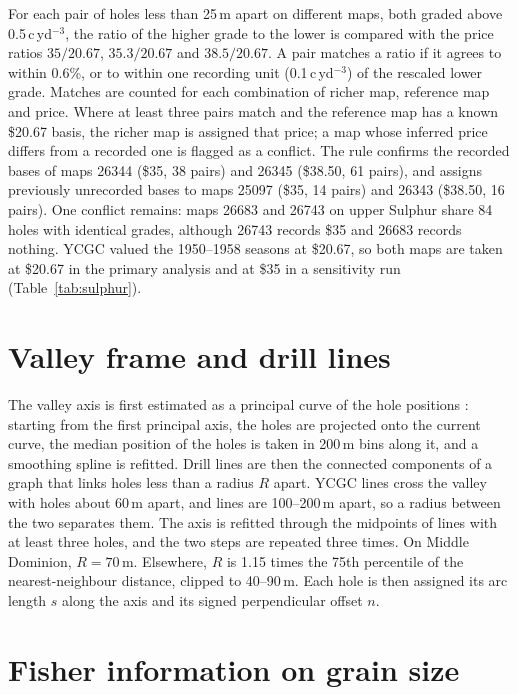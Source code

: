 \documentclass[11pt,a4paper]{article}
\theoremstyle{remark}
\newcommand{\cyd}{c\,yd$^{-3}$}
\begin{document}
For each pair of holes less than 25\,m apart on different maps, both graded above 0.5\,\cyd, the ratio of the higher grade to the lower is compared with the price ratios $35/20.67$, $35.3/20.67$ and $38.5/20.67$. A pair matches a ratio if it agrees to within 0.6\%, or to within one recording unit (0.1\,\cyd) of the rescaled lower grade. Matches are counted for each combination of richer map, reference map and price. Where at least three pairs match and the reference map has a known \$20.67 basis, the richer map is assigned that price; a map whose inferred price differs from a recorded one is flagged as a conflict. The rule confirms the recorded bases of maps 26344 (\$35, 38 pairs) and 26345 (\$38.50, 61 pairs), and assigns previously unrecorded bases to maps 25097 (\$35, 14 pairs) and 26343 (\$38.50, 16 pairs). One conflict remains: maps 26683 and 26743 on upper Sulphur share 84 holes with identical grades, although 26743 records \$35 and 26683 records nothing. YCGC valued the 1950--1958 seasons at \$20.67, so both maps are taken at \$20.67 in the primary analysis and at \$35 in a sensitivity run (Table~\ref{tab:sulphur}).

\section{Valley frame and drill lines}\label{app:frame}

The valley axis is first estimated as a principal curve of the hole positions \citep{Hastie1989}: starting from the first principal axis, the holes are projected onto the current curve, the median position of the holes is taken in 200\,m bins along it, and a smoothing spline is refitted. Drill lines are then the connected components of a graph that links holes less than a radius $R$ apart. YCGC lines cross the valley with holes about 60\,m apart, and lines are 100--200\,m apart, so a radius between the two separates them. The axis is refitted through the midpoints of lines with at least three holes, and the two steps are repeated three times. On Middle Dominion, $R = 70$\,m. Elsewhere, $R$ is 1.15 times the 75th percentile of the nearest-neighbour distance, clipped to 40--90\,m. Each hole is then assigned its arc length $s$ along the axis and its signed perpendicular offset $n$.

\section{Fisher information on grain size}\label{app:fisher}
\end{document}
